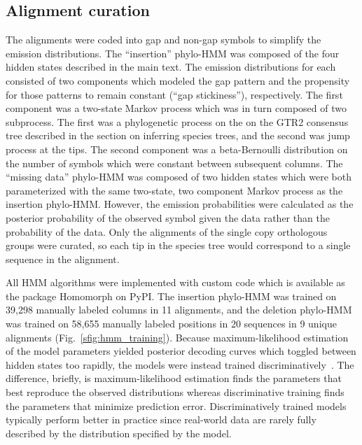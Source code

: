 \subsection*{Alignment curation}
The alignments were coded into gap and non-gap symbols to simplify the emission distributions. The ``insertion'' phylo-HMM was composed of the four hidden states described in the main text. The emission distributions for each consisted of two components which modeled the gap pattern and the propensity for those patterns to remain constant (``gap stickiness''), respectively. The first component was a two-state Markov process which was in turn composed of two subprocess. The first was a phylogenetic process on the on the GTR2 consensus tree described in the section on inferring species trees, and the second was jump process at the tips. The second component was a beta-Bernoulli distribution on the number of symbols which were constant between subsequent columns. The ``missing data'' phylo-HMM was composed of two hidden states which were both parameterized with the same two-state, two component Markov process as the insertion phylo-HMM. However, the emission probabilities were calculated as the posterior probability of the observed symbol given the data rather than the probability of the data. Only the alignments of the single copy orthologous groups were curated, so each tip in the species tree would correspond to a single sequence in the alignment.

All HMM algorithms were implemented with custom code which is available as the package Homomorph on PyPI. The insertion phylo-HMM was trained on 39,298 manually labeled columns in 11 alignments, and the deletion phylo-HMM was trained on 58,655 manually labeled positions in 20 sequences in 9 unique alignments (Fig.~\ref{sfig:hmm_training}). Because maximum-likelihood estimation of the model parameters yielded posterior decoding curves which toggled between hidden states too rapidly, the models were instead trained discriminatively~\cite{Krogh1999}. The difference, briefly, is maximum-likelihood estimation finds the parameters that best reproduce the observed distributions whereas discriminative training finds the parameters that minimize prediction error. Discriminatively trained models typically perform better in practice since real-world data are rarely fully described by the distribution specified by the model.

